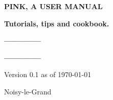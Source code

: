 
\thispagestyle{empty}
\LARGE
\centerline{\bf PINK, A USER MANUAL }
\vspace{2mm}
\centerline{\bf Tutorials, tips and cookbook.}
\normalsize
\vfill
\centerline{\bf --------------}
\vfill

\vfill
\centerline{\bf --------------}
\vfill

\vspace{1cm}
\centerline{Version 0.1 as of \today}
\vspace{1cm}

Noisy-le-Grand

\vspace{1mm}


\newpage
